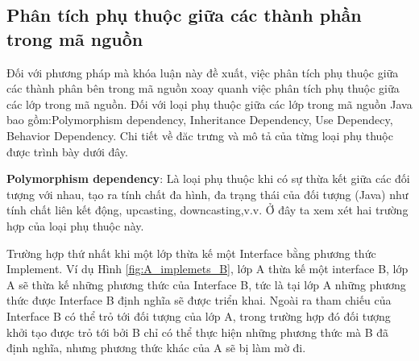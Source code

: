 \documentclass[12pt]{report}
\begin{document}
\subsection{Phân tích phụ thuộc giữa các thành phần trong mã nguồn}
Đối với phương pháp mà khóa luận này đề xuất, việc phân tích phụ thuộc giữa các thành phân bên trong mã nguồn xoay quanh việc phân tích phụ thuộc giữa các lớp trong mã nguồn. Đối với loại phụ thuộc giữa các lớp trong mã nguồn Java bao gồm:Polymorphism dependency, Inheritance Dependency, Use Dependecy, 	Behavior Dependency. Chi tiết về đăc trưng và mô tả của từng loại phụ thuộc được trình bày dưới đây.

\noindent \textbf{Polymorphism dependency}: Là loại phụ thuộc khi có sự thừa kết giữa các đối tượng với nhau, tạo ra tính chất đa hình, đa trạng thái của đối tượng (Java) như tính chất liên kết động, upcasting, downcasting,v.v. Ở đây ta xem xét hai trường hợp của loại phụ thuộc này. 

\noindent Trường hợp thứ nhất khi một lớp thừa kế một Interface bằng phương thức Implement. Ví dụ Hình \ref{fig:A_implemets_B}, lớp A  thừa kế một interface B, lớp A sẽ thừa kế những phương thức của Interface B, tức là tại lớp A những phương thức được Interface B định nghĩa sẽ được triển khai. Ngoài ra tham chiếu của Interface B có thể trỏ tới đối tượng của lớp A, trong trường hợp đó đối tượng khởi tạo được trỏ tới bởi B chỉ có thể thực hiện những phương thức mà B đã định nghĩa, nhưng phương thức khác của A sẽ bị làm mờ đi. 
\end{document}

